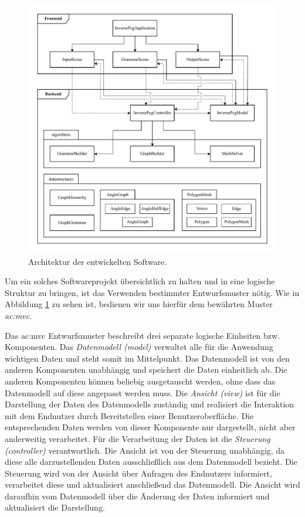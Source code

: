 \begin{figure}[h]
    \centering
    \includegraphics[width=\textwidth]{images/architecture.pdf}
    \caption{Architektur der entwickelten Software.}
    \label{fig:architecture}
\end{figure}

Um ein solches Softwareprojekt übersichtlich zu halten und in eine logische Struktur zu bringen, ist das Verwenden bestimmter Entwurfsmuster nötig.
Wie in Abbildung \ref{fig:architecture} zu sehen ist, bedienen wir uns hierfür dem bewährten Muster \textit{\gls{ac:mvc}}.

Das \gls{ac:mvc} Entwurfsmuster beschreibt drei separate logische Einheiten bzw. Komponenten. Das \textit{Datenmodell (model)} verwaltet alle für
die Anwendung wichtigen Daten und steht somit im Mittelpunkt. Das Datenmodell ist von den anderen Komponenten unabhängig und speichert die Daten einheitlich
ab. Die anderen Komponenten können beliebig ausgetauscht werden, ohne dass das Datenmodell auf diese angepasst werden muss. Die \textit{Ansicht (view)}
ist für die Darstellung der Daten des Datenmodells zuständig und realisiert die Interaktion mit dem Endnutzer durch Bereitstellen einer Benutzeroberfläche.
Die entsprechenden Daten werden von dieser Komponente nur dargestellt, nicht aber anderweitig verarbeitet. Für die Verarbeitung der Daten ist die
\textit{Steuerung (controller)} verantwortlich. Die Ansicht ist von der Steuerung unabhängig, da diese alle darzustellenden Daten ausschließlich aus
dem Datenmodell bezieht. Die Steuerung wird von der Ansicht über Anfragen des Endnutzers informiert, verarbeitet diese und aktualisiert anschließend das
Datenmodell. Die Ansicht wird daraufhin vom Datenmodell über die Änderung der Daten informiert und aktualisiert die Darstellung. \cite{48_bucanek}

